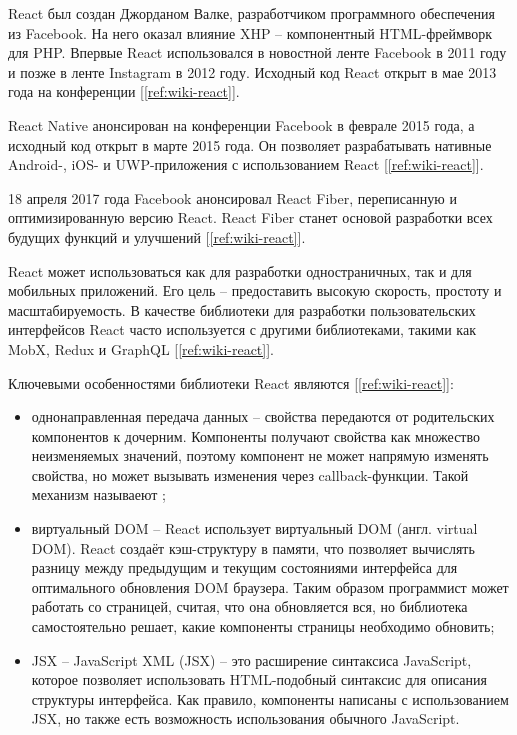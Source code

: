 React был создан Джорданом Валке, разработчиком программного обеспечения из
Facebook. На него оказал влияние XHP -- компонентный HTML-фреймворк для PHP.
Впервые React использовался в новостной ленте Facebook в 2011 году и позже в
ленте Instagram в 2012 году. Исходный код React открыт в мае 2013 года на
конференции  [\ref{ref:wiki-react}].

React Native анонсирован на конференции Facebook  в
феврале 2015 года, а исходный код открыт в марте 2015 года. Он позволяет
разрабатывать нативные Android-, iOS- и UWP-приложения с использованием React [\ref{ref:wiki-react}].

18 апреля 2017 года Facebook анонсировал React Fiber, переписанную и
оптимизированную версию React. React Fiber станет основой разработки всех
будущих функций и улучшений [\ref{ref:wiki-react}].

React может использоваться как для разработки одностраничных, так и для
мобильных приложений. Его цель -- предоставить высокую скорость, простоту и
масштабируемость. В качестве библиотеки для разработки пользовательских
интерфейсов React часто используется с другими библиотеками, такими как MobX,
Redux и GraphQL [\ref{ref:wiki-react}].

Ключевыми особенностями библиотеки React являются [\ref{ref:wiki-react}]:
\begin{itemize}
    \item однонаправленная передача данных -- свойства передаются от
        родительских компонентов к дочерним. Компоненты получают свойства как
        множество неизменяемых значений, поэтому компонент не может напрямую
        изменять свойства, но может вызывать изменения через callback-функции.
        Такой механизм называеют ;

    \item виртуальный DOM -- React использует виртуальный DOM (англ. virtual
        DOM). React создаёт кэш-структуру в памяти, что позволяет вычислять
        разницу между предыдущим и текущим состояниями интерфейса для
        оптимального обновления DOM браузера. Таким образом программист может
        работать со страницей, считая, что она обновляется вся, но библиотека
        самостоятельно решает, какие компоненты страницы необходимо обновить;

    \item JSX -- JavaScript XML (JSX) -- это расширение синтаксиса JavaScript,
        которое позволяет использовать HTML-подобный синтаксис для описания
        структуры интерфейса. Как правило, компоненты написаны с использованием
        JSX, но также есть возможность использования обычного JavaScript.
\end{itemize}

